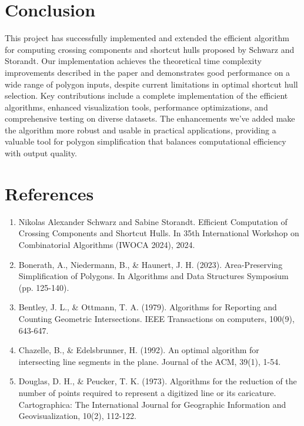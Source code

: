 \documentclass[11pt]{article}
\begin{document}
\section{Conclusion}
This project has successfully implemented and extended the efficient algorithm for computing crossing components and shortcut hulls proposed by Schwarz and Storandt. Our implementation achieves the theoretical time complexity improvements described in the paper and demonstrates good performance on a wide range of polygon inputs, despite current limitations in optimal shortcut hull selection. Key contributions include a complete implementation of the efficient algorithms, enhanced visualization tools, performance optimizations, and comprehensive testing on diverse datasets. The enhancements we've added make the algorithm more robust and usable in practical applications, providing a valuable tool for polygon simplification that balances computational efficiency with output quality.

\section*{References}

\begin{enumerate}
    \item Nikolas Alexander Schwarz and Sabine Storandt. Efficient Computation of Crossing Components and Shortcut Hulls. In 35th International Workshop on Combinatorial Algorithms (IWOCA 2024), 2024.
    
    \item Bonerath, A., Niedermann, B., \& Haunert, J. H. (2023). Area-Preserving Simplification of Polygons. In Algorithms and Data Structures Symposium (pp. 125-140).
    
    \item Bentley, J. L., \& Ottmann, T. A. (1979). Algorithms for Reporting and Counting Geometric Intersections. IEEE Transactions on computers, 100(9), 643-647.
    
    \item Chazelle, B., \& Edelsbrunner, H. (1992). An optimal algorithm for intersecting line segments in the plane. Journal of the ACM, 39(1), 1-54.
    
    \item Douglas, D. H., \& Peucker, T. K. (1973). Algorithms for the reduction of the number of points required to represent a digitized line or its caricature. Cartographica: The International Journal for Geographic Information and Geovisualization, 10(2), 112-122.
\end{enumerate}
\end{document}
